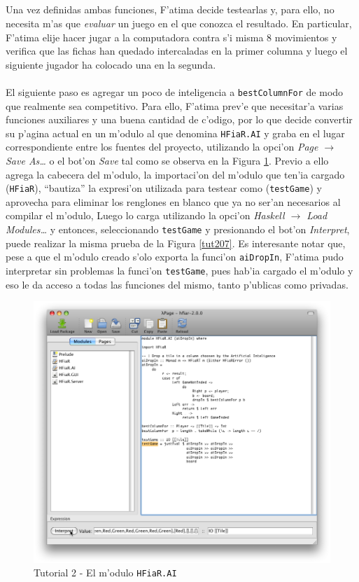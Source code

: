 \documentclass[a4paper]{article}
\begin{document}
\newpage
\subparagraph{}Una vez definidas ambas funciones, F'atima decide testearlas y, para ello, no necesita m'as que \textsl{evaluar} un juego en el que conozca el resultado.  En particular, F'atima elije hacer jugar a la computadora contra s'i misma 8 movimientos y verifica que las fichas han quedado intercaladas en la primer columna y luego el siguiente jugador ha colocado una en la segunda.
\paragraph{}El siguiente paso es agregar un poco de inteligencia a \texttt{bestColumnFor} de modo que realmente sea competitivo.  Para ello, F'atima prev'e que necesitar'a varias funciones auxiliares y una buena cantidad de c'odigo, por lo que decide convertir su p'agina actual en un m'odulo al que denomina \texttt{HFiaR.AI} y graba en el lugar correspondiente entre los fuentes del proyecto, utilizando la opci'on \textsl{Page $\rightarrow$ Save As\ldots} o el bot'on \textsl{Save} tal como se observa en la Figura \ref{tut208}.  Previo a ello agrega la cabecera del m'odulo, la importaci'on del m'odulo que ten'ia cargado (\texttt{HFiaR}), ``bautiza'' la expresi'on utilizada para testear como (\texttt{testGame}) y aprovecha para eliminar los renglones en blanco que ya no ser'an necesarios al compilar el m'odulo,  Luego lo carga utilizando la opci'on \textsl{Haskell $\rightarrow$ Load Modules\ldots} y entonces, seleccionando \texttt{testGame} y presionando el bot'on \textsl{Interpret}, puede realizar la misma prueba de la Figura \ref{tut207}.  Es interesante notar que, pese a que el m'odulo creado s'olo exporta la funci'on \texttt{aiDropIn}, F'atima pudo interpretar sin problemas la funci'on \texttt{testGame}, pues hab'ia cargado el m'odulo y eso le da acceso a todas las funciones del mismo, tanto p'ublicas como privadas.
\begin{figure}[hp]
	\begin{center}
        	\includegraphics[width=.75\textwidth]{pictures/tut2/07}
		\caption{Tutorial 2 - El m'odulo \texttt{HFiaR.AI}}
		\label{tut208}
	\end{center}
\end{figure}
\end{document}

